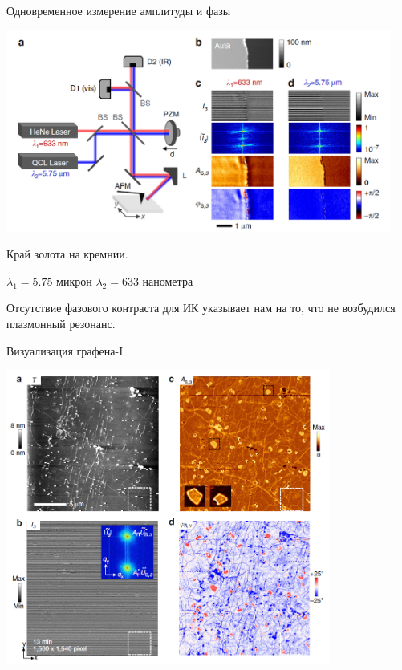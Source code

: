 \documentclass[9pt, compress, xcolor=table]{beamer}
\begin{document}
\begin{frame}{Одновременное измерение амплитуды и фазы}

\begin{center}
\includegraphics[width=0.95\textwidth]{hillen_3}

Край золота на кремнии.

$\lambda_1=5.75$ микрон
$\lambda_2=633$ нанометра

Отсутствие фазового контраста для ИК указывает нам на то, что не возбудился плазмонный резонанс.
\end{center}
\end{frame}

\begin{frame}{Визуализация графена-I}

\begin{center}
\includegraphics[width=0.8\textwidth]{hillen_4}

\end{center}
\end{frame}
\end{document}
